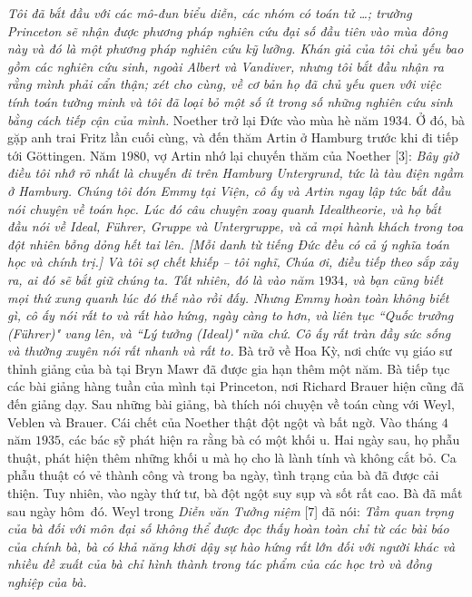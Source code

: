 \begin{multicols}{2}
	\vskip 0.05cm
	\textit{Tôi đã bắt đầu với các mô-đun biểu diễn, các nhóm có toán tử \ldots; trường Princeton sẽ nhận được phương pháp nghiên cứu đại số đầu tiên vào mùa đông này và đó là một phương pháp nghiên cứu kỹ lưỡng. Khán giả của tôi chủ yếu bao gồm các nghiên cứu sinh, ngoài Albert và Vandiver, nhưng tôi bắt đầu nhận ra rằng mình phải cẩn thận; xét cho cùng, về cơ bản họ đã chủ yếu quen với việc tính toán tường minh và tôi đã loại bỏ một số ít trong số những nghiên cứu sinh bằng cách tiếp cận của mình.}
	\vskip 0.05cm
	Noether trở lại Đức vào mùa hè năm $1934$. Ở đó, bà gặp anh trai Fritz lần cuối cùng, và đến thăm Artin ở Hamburg trước khi đi tiếp tới Göttingen. Năm $1980$, vợ Artin nhớ lại chuyến thăm của Noether [$3$]:
	\vskip 0.05cm
	\textit{Bây giờ điều tôi nhớ rõ nhất là chuyến đi trên Hamburg Untergrund, tức là tàu điện ngầm ở Hamburg. Chúng tôi đón Emmy tại Viện, cô ấy và Artin ngay lập tức bắt đầu nói chuyện về toán học. Lúc đó câu chuyện xoay quanh Idealtheorie, và họ bắt đầu nói về Ideal, Führer, Gruppe và Untergruppe, và cả mọi hành khách trong toa  đột nhiên bỗng dỏng hết tai lên. [Mỗi danh từ tiếng Đức đều có cả ý nghĩa toán học và chính trị.] Và tôi sợ chết khiếp -- tôi nghĩ, Chúa ơi, điều tiếp theo sắp xảy ra, ai đó sẽ bắt giữ chúng ta. Tất nhiên, đó là vào năm $1934$, và bạn cũng biết mọi thứ xung quanh lúc đó thế nào rồi đấy. Nhưng Emmy hoàn toàn không biết gì, cô ấy nói rất to và rất hào hứng, ngày càng to hơn, và liên tục ``Quốc trưởng (Führer)" vang lên, và ``Lý tưởng (Ideal)" nữa chứ. Cô ấy rất tràn đầy sức sống và thường xuyên nói rất nhanh và rất to.}
	\vskip 0.05cm
	Bà trở về Hoa Kỳ, nơi chức vụ giáo sư thỉnh giảng của bà tại Bryn Mawr đã được gia hạn thêm một năm. Bà  tiếp tục các bài giảng hàng tuần của mình tại Princeton, nơi Richard Brauer hiện cũng đã đến giảng dạy. Sau những bài giảng, bà thích nói chuyện về toán cùng với Weyl, Veblen và Brauer.
	\vskip 0.05cm
	Cái chết của Noether thật đột ngột và bất ngờ. Vào tháng $4$ năm $1935$, các bác sỹ phát hiện ra rằng bà có một khối u. Hai ngày sau, họ phẫu thuật, phát hiện thêm những khối u mà họ cho là lành tính và không cắt bỏ. Ca phẫu thuật có vẻ thành công và trong ba ngày, tình trạng của bà đã được cải thiện. Tuy nhiên, vào ngày thứ tư, bà đột ngột suy sụp và sốt rất cao. Bà đã mất sau ngày hôm~đó.
	\vskip 0.05cm
	Weyl trong \textit{Diễn văn Tưởng niệm} [$7$] đã nói:
	\vskip 0.05cm
	\textit{Tầm quan trọng của bà đối với môn đại số không thể được đọc thấy hoàn toàn chỉ từ các bài báo của chính bà, bà có khả năng khơi dậy sự hào hứng rất lớn đối với người khác và nhiều đề xuất của bà chỉ hình thành trong tác phẩm của các học trò và đồng nghiệp của bà.}

\end{multicols}
